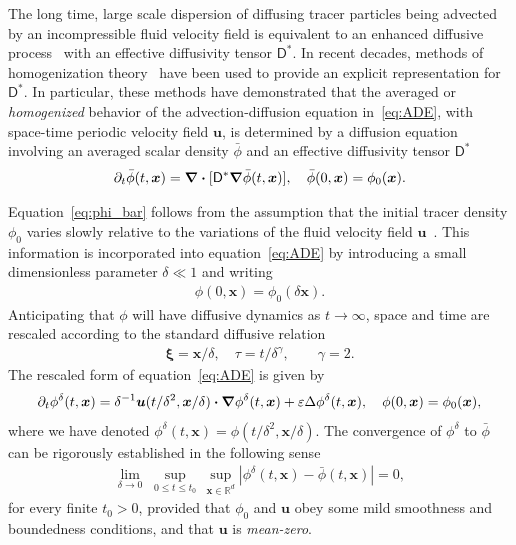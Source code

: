 \documentclass[leqno,onefignum,onetabnum]{siamltex1213}
\newcommand{\Dm}{\mathsf{D}}
\newcommand\bnabla{\mbox{\boldmath${\nabla}$}}
\providecommand\bcdot{\boldsymbol{\cdot}}
\newcommand{\vecx}{\boldsymbol{x}}
\newcommand{\vecu}{\boldsymbol{u}}
\newcommand{\vecxi}{\boldsymbol{\xi}}
\begin{document}
The long time, large scale dispersion of diffusing tracer particles
being advected by an incompressible fluid velocity field is equivalent
to an enhanced diffusive process~\cite{Taylor:PRSL:196} with an
effective diffusivity tensor $\Dm^*$. In recent decades, methods of
homogenization
theory~\cite{McLaughlin:SIAM_JAM:780,Fannjiang:1994:SIAM_JAM:333,Novikov:2005:CPAM:867,Majda:Kramer:1999:book}
have been used to provide an explicit representation for
$\Dm^*$. In particular, these methods have demonstrated that the
averaged or \emph{homogenized} behavior of the advection-diffusion
equation in~\eqref{eq:ADE}, with space-time periodic velocity field
$\vecu$, is determined by a diffusion equation
involving an averaged scalar density $\bar{\phi}$ and an
effective diffusivity tensor
$\Dm^*$~\cite{Majda:Kramer:1999:book}       
%
\begin{align}\label{eq:phi_bar}
 \partial_t\bar{\phi}(t,\vecx)=\bnabla\bcdot[\Dm^*\bnabla \bar{\phi}(t,\vecx)], \quad
  \bar{\phi}(0,\vecx)=\phi_0(\vecx).
\end{align}




Equation~\eqref{eq:phi_bar}
follows from the assumption that the
initial tracer density $\phi_0$ varies slowly relative to the variations
of the fluid velocity field 
$\vecu$~\cite{McLaughlin:SIAM_JAM:780,Fannjiang:1997:1033,Majda:Kramer:1999:book}.
This information is incorporated into equation~\eqref{eq:ADE} by
introducing a small dimensionless parameter $\delta\ll1$ and
writing~\cite{McLaughlin:SIAM_JAM:780,Fannjiang:1997:1033,Majda:Kramer:1999:book}      
%
\begin{align}
  \phi(0,\vecx)=\phi_0(\delta\vecx). 
\end{align}
%
Anticipating that $\phi$ will have diffusive dynamics as $t\to\infty$, space and 
time are rescaled according to the standard diffusive relation
%
\begin{align}\label{eq:Fast_Vars}
  \vecxi=\vecx/\delta, \quad
  \tau= t/\delta^\gamma,
  \qquad
  \gamma=2.
\end{align}
%
The rescaled form of equation~\eqref{eq:ADE} is given
by~\cite{Majda:Kramer:1999:book}  
%
\begin{align}\label{eq:ADE_delta}
  \partial_t\phi^\delta(t,\vecx)=\delta^{-1}\vecu(t/\delta^2,\vecx/\delta)\bcdot\bnabla\phi^\delta(t,\vecx)
              +\varepsilon\Delta\phi^\delta(t,\vecx),
              \quad
             \phi(0,\vecx)=\phi_0(\vecx), 
\end{align}
%
where we have denoted $\phi^\delta(t,\vecx)=\phi(t/\delta^2,\vecx/\delta)$.
The convergence of $\phi^\delta$  to $\bar{\phi}$
 can be rigorously established in the following
sense~\cite{Majda:Kramer:1999:book}   
%
\begin{align}\label{eq:Homogenization_Theorem}
  \lim_{\delta\to0}\;\sup_{0\leq t\leq t_0}\,\sup_{\vecx\in\mathbb{R}^d}
  |\phi^\delta(t,\vecx)-\bar{\phi}(t,\vecx)| =0,
\end{align}
%
for every finite $t_0>0$, provided that $\phi_0$ and $\vecu$ obey some
mild smoothness and boundedness conditions, and that $\vecu$ is
\emph{mean-zero}.  
\end{document}
